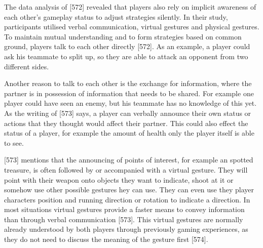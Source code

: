 The data analysis of \textcite{Cheung2012CommunicationGaming}[572] revealed that players also rely on implicit awareness of each other’s gameplay status to adjust strategies silently. In their study, participants utilised verbal communication, virtual gestures and physical gestures.
To maintain mutual understanding and to form strategies based on common ground, players talk to each other directly \autocite{Cheung2012CommunicationGaming}[572]. As an example, a player could ask his teammate to split up, so they are able to attack an opponent from two different sides.

Another reason to talk to each other is the exchange for information, where the partner is in possession of information that needs to be shared. For example one player could have seen an enemy, but his teammate has no knowledge of this yet. As the writing of \textcite{Cheung2012CommunicationGaming}[573] says, a player can verbally announce their own status or actions that they thought would affect their partner. This could also effect the status of a player, for example the amount of health only the player itself is able to see.

\textcite{Cheung2012CommunicationGaming}[573] mentions that the announcing of points of interest, for example an spotted treasure, is often followed by or accompanied with a virtual gesture. They will point with their weapon onto objects they want to indicate, shoot at it or somehow use other possible gestures hey can use. They can even use they player characters position and running direction or rotation to indicate a direction.
In most situations virtual gestures provide a faster means to convey information than through verbal communication \autocite{Cheung2012CommunicationGaming}[573]. This virtual gestures are normally already understood by both players through previously gaming experiences, as they do not need to discuss the meaning of the gesture first \autocite{Cheung2012CommunicationGaming}[574].

